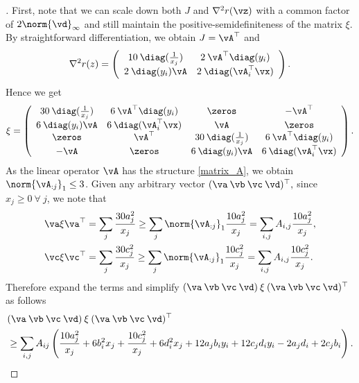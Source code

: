 \begin{proof} [\unskip\nopunct]
    First, note that we can scale down both $J$ and $\nabla^2 r(\vz)$ with a common factor of $2 \norm{\vd}_\infty$ and still maintain the positive-semidefiniteness of the matrix $\xi.$ By straightforward differentiation, we obtain $J = \vA^\top$ and 
    \begin{equation*}
        \nabla^2 r(z) = \left(
        \begin{array}{cc}
        10 \: \diag(\frac{1}{x_j}) & 2 \: \vA^\top \diag(y_i)\\
        2 \: \diag(y_i) \vA & 2 \: \diag(\vA_i^\top \vx)
        \end{array} \right). 
    \end{equation*}
    Hence we get
    \begin{equation*}
        \xi = \left(
        \begin{array}{cccc}
        30 \: \diag(\frac{1}{x_j}) & 6 \: \vA^\top \diag(y_i) & \zeros & -\vA^\top \\
        6 \: \diag(y_i) \vA & 6 \: \diag(\vA_i^\top \vx) & \vA & \zeros \\ 
        \zeros & \vA^\top & 30 \: \diag(\frac{1}{x_j}) & 6 \: \vA^\top \diag(y_i) \\
        - \vA & \zeros &  6 \: \diag(y_i) \vA & 6 \: \diag(\vA_i^\top \vx)
        \end{array} \right). 
    \end{equation*}
    As the linear operator $\vA$ has the structure \eqref{matrix_A}, we obtain $\norm{\vA_{:j}}_1 \leq 3$.
    Given any arbitrary vector $(\va \: \vb \: \vc \: \vd)^\top,$ since $x_j \geq 0 \: \forall \: j$, we note that 
    \begin{align*}
        \va \xi \va^\top &= \sum_{j} \frac{30 a_j^2}{x_j} \geq \sum_{j} \norm{\vA_{:j}}_1  \frac{10 a_j^2}{x_j} = \sum_{i,j} A_{i,j} \frac{10 a_j^2}{x_j}, \\
        \vc \xi \vc^\top &= \sum_{j} \frac{30 c_j^2}{x_j} \geq \sum_{j} \norm{\vA_{:j}}_1  \frac{10 c_j^2}{x_j} = \sum_{i,j} A_{i,j} \frac{10 c_j^2}{x_j}.
    \end{align*}
    Therefore expand the terms and simplify $(\va \: \vb \: \vc \: \vd) \: \xi \: (\va \: \vb \: \vc \: \vd)^\top$ as follows
    \begin{align*}
        &(\va \: \vb \: \vc \: \vd) \: \xi \: (\va \: \vb \: \vc \: \vd)^\top \\ 
        &\geq \sum_{i,j} A_{ij} \left(\frac{10a_j^2}{x_j} + 6b_i^2x_j + \frac{10c_j^2}{x_j} + 6 d_i^2x_j + 12 a_j b_i y_i + 12 c_j d_i y_i - 2a_j d_i + 2c_j b_i \right).

\end{align*}
\end{proof}
